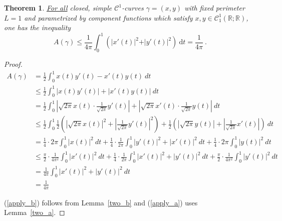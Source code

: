 \documentclass[12pt, reqno]{article}
\newtheorem*{theorem*}{Theorem}          %
\theoremstyle{definition}
\theoremstyle{remark}
\newcommand{\ud}{\mathrm{d}}
\begin{document}
\begin{itemize}
\begin{theorem*}
{\underline{For all}} closed, simple $\mathcal{C}^1$-curves $\gamma=(x,y)$ with fixed perimeter $L=1$ and parametrized by component functions which satisfy $x,y \in \mathcal{C}_1^1(\mathbb{R}; \mathbb{R})$, one has the inequality
\begin{equation} \label{eq_isoperim}
A(\gamma) \leq \frac{1}{4 \pi} \int_0^1 \left( \vert x'(t) \vert^2 + \vert y'(t) \vert^2 \right) ~\ud t = \frac{1}{4 \pi} ~\mbox{.}
\end{equation}
\end{theorem*}

\begin{proof}
    \begin{align}
        A(\gamma)&= \frac{1}{2}\int_{0}^{1}x(t)y'(t)-x'(t)y(t)\ dt\\
        &\le \frac{1}{2}\int_{0}^{1}|x(t)y'(t)|+|x'(t)y(t)|\ dt\\
        &= \frac{1}{2}\int_{0}^{1}|\sqrt{2\pi} x(t)\cdot \frac{1}{\sqrt{2\pi}}y'(t)|+|\sqrt{2\pi} x'(t)\cdot \frac{1}{\sqrt{2\pi}}y(t)|\ dt\\
        &\le \frac{1}{2}\int_{0}^{1} \frac{1}{2}\left(|\sqrt{2\pi} x(t)|^{2}+ \left| \frac{1}{\sqrt{2\pi}}y'(t)\right|^{2}\right)+ \frac{1}{2}\left(|\sqrt{2\pi} y(t)|+ \left| \frac{1}{\sqrt{2\pi}} x'(t)\right|\right)\ dt \label{apply_b}\\
        &= \frac{1}{4}\cdot 2\pi\int_{0}^{1}|x(t)|^{2}\ dt+ \frac{1}{4}\cdot \frac{1}{2\pi}\int_{0}^{1}|y'(t)|^{2}+|x'(t)|^{2}\ dt+ \frac{1}{4}\cdot 2\pi\int_{0}^{1}|y(t)|^{2}\ dt\\
        &\le \frac{\pi}{2}\cdot \frac{1}{4\pi^{2}}\int_{0}^{1}|x'(t)|^{2}\ dt+ \frac{1}{4}\cdot \frac{1}{2\pi}\int_{0}^{1}|x'(t)|^{2}+|y'(t)|^{2}\ dt+ \frac{\pi}{2}\cdot \frac{1}{4\pi^{2}}\int_{0}^{1}|y'(t)|^{2}\ dt\label{apply_a}\\
        &= \frac{1}{4\pi}\int_{0}^{1}|x'(t)|^{2}+|y'(t)|^{2}\ dt\\
        &= \frac{1}{4\pi}
    \end{align}

    (\ref{apply_b}) follows from Lemma~\ref{two_b} and (\ref{apply_a}) uses Lemma~\ref{two_a}.
\end{proof}

\end{itemize}
\end{document}
